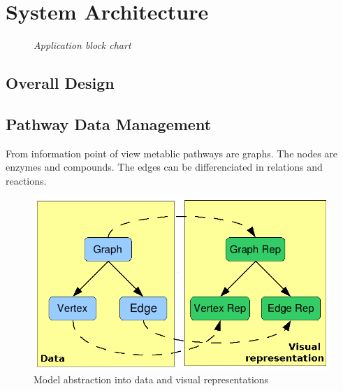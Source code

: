
\chapter{System Architecture}

\begin{figure}[ht]
\centering
{} 
\caption[Application block chart]{\textit{Application block chart}} 
\label{gfx:application_block_chart}
\end{figure}

\section{Overall Design}
\section{Pathway Data Management}

From information point of view metablic pathways are graphs. The nodes are enzymes and compounds. The edges can be differenciated in relations and reactions.

\begin{figure}[ht]
  \centering
    \includegraphics[width=0.5\linewidth]{gfx/model_view_data_diagram}
  \caption{Model abstraction into data and visual representations}
  \label{fig:model_view_data_diagram}
\end{figure}

